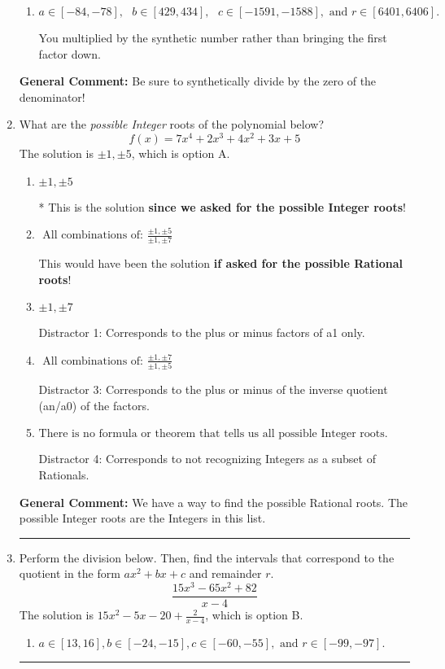 \documentclass{extbook}[14pt]
\newcommand{\litem}[1]{\item #1

\rule{\textwidth}{0.4pt}}
\begin{document}
\begin{enumerate}
{\begin{enumerate}[label=\Alph*.]
 You multiplied by the synthetic number and subtracted rather than adding during synthetic division.
\item \( a \in [-84, -78], \text{   } b \in [429, 434], \text{   } c \in [-1591, -1588], \text{   and   } r \in [6401, 6406]. \)

 You multiplied by the synthetic number rather than bringing the first factor down.
\end{enumerate}

\textbf{General Comment:} Be sure to synthetically divide by the zero of the denominator!
}
\litem{
What are the \textit{possible Integer} roots of the polynomial below?
\[ f(x) = 7x^{4} +2 x^{3} +4 x^{2} +3 x + 5 \]The solution is \( \pm 1,\pm 5 \), which is option A.\begin{enumerate}[label=\Alph*.]
\item \( \pm 1,\pm 5 \)

* This is the solution \textbf{since we asked for the possible Integer roots}!
\item \( \text{ All combinations of: }\frac{\pm 1,\pm 5}{\pm 1,\pm 7} \)

This would have been the solution \textbf{if asked for the possible Rational roots}!
\item \( \pm 1,\pm 7 \)

 Distractor 1: Corresponds to the plus or minus factors of a1 only.
\item \( \text{ All combinations of: }\frac{\pm 1,\pm 7}{\pm 1,\pm 5} \)

 Distractor 3: Corresponds to the plus or minus of the inverse quotient (an/a0) of the factors. 
\item \( \text{There is no formula or theorem that tells us all possible Integer roots.} \)

 Distractor 4: Corresponds to not recognizing Integers as a subset of Rationals.
\end{enumerate}

\textbf{General Comment:} We have a way to find the possible Rational roots. The possible Integer roots are the Integers in this list.
}
\litem{
Perform the division below. Then, find the intervals that correspond to the quotient in the form $ax^2+bx+c$ and remainder $r$.
\[ \frac{15x^{3} -65 x^{2} + 82}{x -4} \]The solution is \( 15x^{2} -5 x -20 + \frac{2}{x -4} \), which is option B.\begin{enumerate}[label=\Alph*.]
\item \( a \in [13, 16], b \in [-24, -15], c \in [-60, -55], \text{ and } r \in [-99, -97]. \)


\end{enumerate}}
\end{enumerate}
\end{document}
